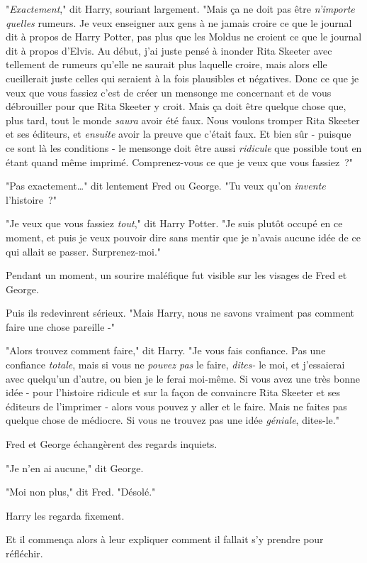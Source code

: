 "\emph{Exactement}," dit Harry, souriant largement. "Mais ça ne doit pas être \emph{n'importe quelles} rumeurs. Je veux enseigner aux gens à ne jamais croire ce que le journal dit à propos de Harry Potter, pas plus que les Moldus ne croient ce que le journal dit à propos d'Elvis. Au début, j'ai juste pensé à inonder Rita Skeeter avec tellement de rumeurs qu'elle ne saurait plus laquelle croire, mais alors elle cueillerait juste celles qui seraient à la fois plausibles et négatives. Donc ce que je veux que vous fassiez c'est de créer un mensonge me concernant et de vous débrouiller pour que Rita Skeeter y croit. Mais ça doit être quelque chose que, plus tard, tout le monde \emph{saura} avoir été faux. Nous voulons tromper Rita Skeeter et ses éditeurs, et \emph{ensuite} avoir la preuve que c'était faux. Et bien sûr - puisque ce sont là les conditions - le mensonge doit être aussi \emph{ridicule} que possible tout en étant quand même imprimé. Comprenez-vous ce que je veux que vous fassiez~?"

"Pas exactement…" dit lentement Fred ou George. "Tu veux qu'on \emph{invente} l'histoire~?"

"Je veux que vous fassiez \emph{tout}," dit Harry Potter. "Je suis plutôt occupé en ce moment, et puis je veux pouvoir dire sans mentir que je n'avais aucune idée de ce qui allait se passer. Surprenez-moi."

Pendant un moment, un sourire maléfique fut visible sur les visages de Fred et George.

Puis ils redevinrent sérieux. "Mais Harry, nous ne savons vraiment pas comment faire une chose pareille -"

"Alors trouvez comment faire," dit Harry. "Je vous fais confiance. Pas une confiance \emph{totale}, mais si vous ne \emph{pouvez pas} le faire, \emph{dites-} le moi, et j'essaierai avec quelqu'un d'autre, ou bien je le ferai moi-même. Si vous avez une très bonne idée - pour l'histoire ridicule et sur la façon de convaincre Rita Skeeter et ses éditeurs de l'imprimer - alors vous pouvez y aller et le faire. Mais ne faites pas quelque chose de médiocre. Si vous ne trouvez pas une idée \emph{géniale}, dites-le."

Fred et George échangèrent des regards inquiets.

"Je n'en ai aucune," dit George.

"Moi non plus," dit Fred. "Désolé."

Harry les regarda fixement.

Et il commença alors à leur expliquer comment il fallait s'y prendre pour réfléchir.

